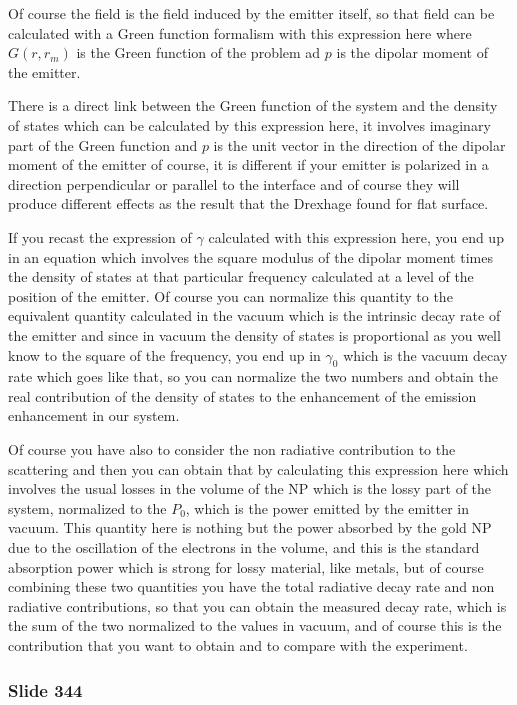 \documentclass[../main/main.tex]{subfiles}
\begin{document}
Of course the field is the field induced by the emitter itself, so that field can be calculated with a Green function formalism with this expression here where $G(r,r_m)$ is the Green function of the problem ad $p$ is the dipolar moment of the emitter.

There is a direct link between the Green function of the system and the density of states which can be calculated by this expression here, it involves imaginary part of the Green function and $p$ is the unit vector in the direction of the dipolar moment of the emitter of course, it is different if your emitter is polarized in a direction perpendicular or parallel to the interface and of course they will produce different effects as the result that the Drexhage found for flat surface.

If you recast the expression of $\gamma$ calculated with this expression here, you end up in an equation which involves the square modulus of the dipolar moment times the density of states at that particular frequency calculated at a level of the position of the emitter. Of course you can normalize this quantity to the equivalent quantity calculated in the vacuum which is the intrinsic decay rate of the emitter and since in vacuum the density of states is proportional as you well know to the square of the frequency, you end up in $\gamma_0$ which is the vacuum decay rate which goes like that, so you can normalize the two numbers and obtain the real contribution of the density of states to the enhancement of the emission enhancement in our system.

Of course you have also to consider the non radiative contribution to the scattering and then you can obtain that by calculating this expression here which involves the usual losses in the volume of the NP which is the lossy part of the system, normalized to the $P_0$, which is the power emitted by the emitter in vacuum. This quantity here is nothing but the power absorbed by the gold NP due to the oscillation of the electrons in the volume, and this is the standard absorption power which is strong for lossy material, like metals, but of course combining these two quantities you have the total radiative decay rate and non radiative contributions, so that you can obtain the measured decay rate, which is the sum of the two normalized to the values in vacuum, and of course this is the contribution that you want to obtain and to compare with the experiment.


\newpage

\subsubsection{Slide 344}
\end{document}
